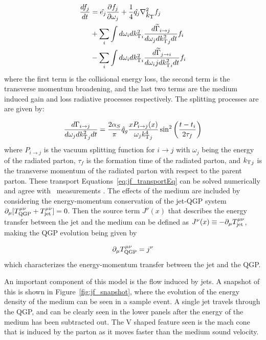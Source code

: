 \begin{align}
\label{eq:jf_transportEq}
\frac{d f_j}{dt} &= \hat{e_j} \frac{\partial f_j}{\partial \omega_j} + \frac{1}{4} \hat{q_j} \nabla_{\mbox{$k_{\rm T}$}}^2 f_j  \\
& + \sum_i \int d\omega_i d\mbox{$k_{\rm T}^2$}_i \frac{d\widetilde{\Gamma}_{i\rightarrow j} }{d\omega_j d\mbox{$k_{\rm T}^2$}_j dt} f_i \\
& - \sum_i \int d\omega_i d\mbox{$k_{\rm T}^2$}_i \frac{d\widetilde{\Gamma}_{j\rightarrow i} }{d\omega_ij d\mbox{$k_{\rm T}^2$}_i dt} f_i \\
\end{align}
where the first term is the collisional energy loss, the second term is the transverse momentum broadening, and the last two terms are the medium induced gain and loss radiative processes respectively. The splitting processes are are given by:

\begin{align}
\frac{d\Gamma_{i \rightarrow j}}{d \omega_j d\mbox{$k_{\rm T}^2$}_j dt} = \frac{2\alpha_S}{\pi} \hat{q}_g \frac{x P_{i \rightarrow j} (x)}{\omega_j {k_{\rm T}^4}_j} \sin^2 \left(\dfrac{t - t_i}{2\tau_f} \right)
\end{align}
where $P_{i \rightarrow j} $ is the vacuum splitting function for $i \rightarrow j $ with $\omega_j$ being the energy of the radiated parton, $\tau_f$ is the formation time of the radiated parton, and $\mbox{$k_{\rm T}$}_j$ is the transverse momentum of the radiated parton with respect to the parent parton. These transport Equations~\ref{eq:jf_transportEq} can be solved numerically and agree with \RAA\ measurements \cite{Aad:2014bxa, Khachatryan:2016jfl, Abelev:2013kqa}. The effects of the medium are included by considering the energy-momentum conservation of the jet-QGP system $ \partial_\mu [T_{\rm QGP}^{\mu\nu} + T_{\rm jet}^{\mu\nu}] = 0$. Then the source term $J^\nu(x)$ that describes the energy transfer between the jet and the medium can be defined as $J^\nu(x) \equiv -\partial_\mu  T_{\rm jet}^{\mu\nu}$, making the QGP evolution being given by

\begin{align}
 \partial_\mu T_{\rm QGP}^{\mu\nu} = j^\nu
\end{align}
which characterizes the energy-momentum transfer between the jet and the QGP. 

An important component of this model is the flow induced by jets. A snapshot of this is shown in Figure~\ref{fig:jf_snapshot}, where the evolution of the energy density of the medium can be seen in a sample event. A single jet travels through the QGP, and can be clearly seen in the lower panels after the energy of the medium has been subtracted out. The V shaped feature seen is the mach cone that is induced by the parton as it moves faster than the medium sound velocity. 

